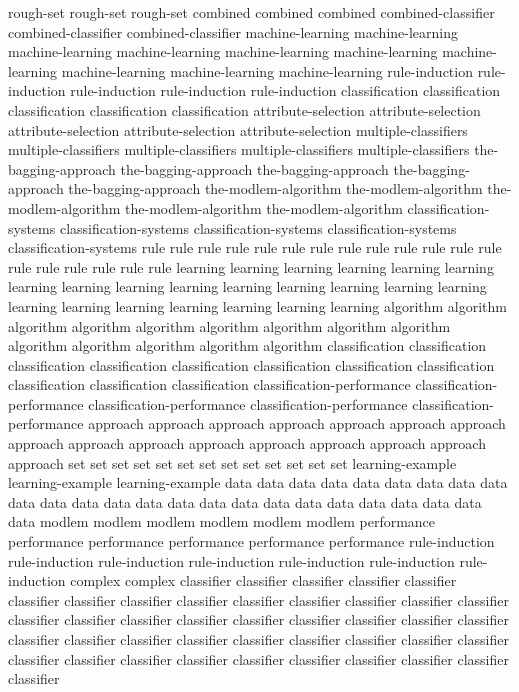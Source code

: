 rough-set	rough-set	rough-set	
combined	combined	combined	
combined-classifier	combined-classifier	combined-classifier	
machine-learning	machine-learning	machine-learning	machine-learning	machine-learning	machine-learning	machine-learning	machine-learning	machine-learning	machine-learning	
rule-induction	rule-induction	rule-induction	rule-induction	rule-induction	
classification	classification	classification	classification	classification	
attribute-selection	attribute-selection	attribute-selection	attribute-selection	attribute-selection	
multiple-classifiers	multiple-classifiers	multiple-classifiers	multiple-classifiers	multiple-classifiers	
the-bagging-approach	the-bagging-approach	the-bagging-approach	the-bagging-approach	the-bagging-approach	
the-modlem-algorithm	the-modlem-algorithm	the-modlem-algorithm	the-modlem-algorithm	the-modlem-algorithm	
classification-systems	classification-systems	classification-systems	classification-systems	classification-systems	
rule	rule	rule	rule	rule	rule	rule	rule	rule	rule	rule	rule	rule	rule	rule	rule	rule	rule	rule	
learning	learning	learning	learning	learning	learning	learning	learning	learning	learning	learning	learning	learning	learning	learning	learning	learning	learning	learning	learning	learning	learning	
algorithm	algorithm	algorithm	algorithm	algorithm	algorithm	algorithm	algorithm	algorithm	algorithm	algorithm	algorithm	algorithm	algorithm	
classification	classification	classification	classification	classification	classification	classification	classification	classification	classification	classification	
classification-performance	classification-performance	classification-performance	classification-performance	classification-performance	
approach	approach	approach	approach	approach	approach	approach	approach	approach	approach	approach	approach	approach	approach	approach	approach	
set	set	set	set	set	set	set	set	set	set	set	set	set	
learning-example	learning-example	learning-example	
data	data	data	data	data	data	data	data	data	data	data	data	data	data	data	data	data	data	data	data	data	data	data	data	data	
modlem	modlem	modlem	modlem	modlem	modlem	
performance	performance	performance	performance	performance	performance	
rule-induction	rule-induction	rule-induction	rule-induction	rule-induction	rule-induction	rule-induction	
complex	complex	
classifier	classifier	classifier	classifier	classifier	classifier	classifier	classifier	classifier	classifier	classifier	classifier	classifier	classifier	classifier	classifier	classifier	classifier	classifier	classifier	classifier	classifier	classifier	classifier	classifier	classifier	classifier	classifier	classifier	classifier	classifier	classifier	classifier	classifier	classifier	classifier	classifier	classifier	classifier	classifier	classifier	classifier	
